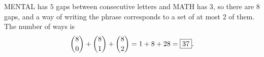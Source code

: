 MENTAL has $5$ gaps between consecutive letters and MATH has $3$, so there are $8$ gaps, and a way of writing the phrase corresponds to a set of at most $2$ of them. The number of ways is
\[\dbinom80+\dbinom81+\dbinom82=1+8+28=\boxed{37}.\]
